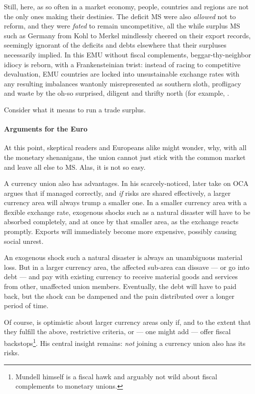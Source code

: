 Still, here, as so often in a market economy, people, countries and regions are not the only ones making their destinies.
The deficit \gls{MS} were also \emph{allowed} not to reform, and they were \emph{fated} to remain uncompetitive, all the while surplus \gls{MS} such as Germany from Kohl to Merkel mindlessly cheered on their export records, seemingly ignorant of the deficits and debts elsewhere that their surpluses necessarily implied.
In this \gls{EMU} without fiscal complements, beggar-thy-neighbor idiocy is reborn, with a Frankensteinian twist:
instead of racing to competitive devaluation, \gls{EMU} countries are locked into unsustainable exchange rates with any resulting imbalances wantonly misrepresented as southern sloth, profligacy and waste by the oh-so surprised, diligent and thrifty north (for example, \citep[200]{Featherstone2011}.

Consider what it means to run a trade surplus.

\paragraph{Arguments for the Euro}
At this point, skeptical readers and Europeans alike might wonder, why, with all the monetary shenanigans, the union cannot just stick with the common market and leave all else to \gls{MS}.
Alas, it is not so easy.

A currency union also has advantages.
In his scarcely-noticed, later take on \gls{OCA} \cite{Mundell1972} argues that if managed correctly, and \emph{if} risks are shared effectively, a larger currency area will always trump a smaller one.
In a smaller currency area with a flexible exchange rate, exogenous shocks such as a natural disaster will have to be absorbed completely, and at once by that smaller area, as the exchange reacts promptly.
Exports will immediately become more expensive, possibly causing social unrest.

An exogenous shock such a natural disaster is always an unambiguous material loss.
But in a larger currency area, the affected sub-area can dissave --- or go into debt --- and pay with existing currency to receive material goods and services from other, unaffected union members.
Eventually, the debt will have to paid back, but the shock can be dampened and the pain distributed over a longer period of time.

Of course, \cite{Mundell1972} is optimistic about larger currency areas only if, and to the extent that they fulfill the above, restrictive criteria, or --- one might add --- offer fiscal backstops\footnote{
	Mundell himself is a fiscal hawk and arguably not wild about fiscal complements to monetary unions.}.
His central insight remains:
\emph{not} joining a currency union also has its risks.

